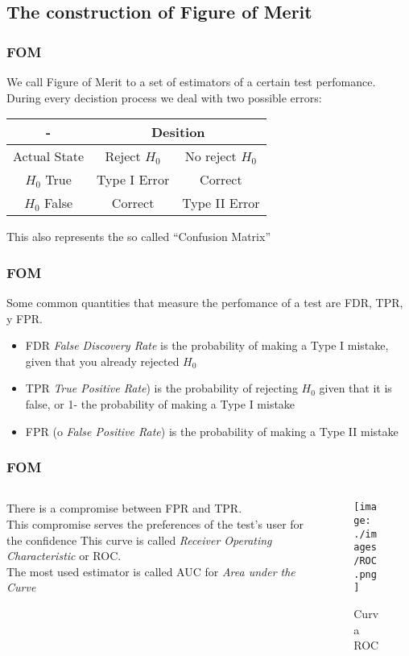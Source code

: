 \documentclass[10pt]{beamer}
\begin{document}
\subsection{The construction of Figure of Merit}
\begin{frame}\frametitle{FOM}
 We call Figure of Merit to a set of estimators of a certain test perfomance.
During every decistion process we deal with two possible errors: 
\begin{center}
\begin{tabular}{|c|c|l|}
\hline
- & \multicolumn{2}{c|}{Desition}\\
\hline \hline
Actual State & Reject $H_0$ & \multicolumn{1}{c|}{No reject $H_0$}\\
\hline
$H_0$ True & Type I Error & \multicolumn{1}{c|}{Correct}\\
\hline
$H_0$ False & Correct & \multicolumn{1}{c|}{Type II Error}\\
\hline
\end{tabular}
\end{center}
This also represents the so called ``Confusion Matrix''
\end{frame}
\begin{frame} \frametitle{FOM}
 Some common quantities that measure the perfomance of a test are FDR, TPR, y FPR.
\begin{itemize}
 \item FDR \textit{False Discovery Rate} is the probability of making a Type I 
 mistake, given that you already rejected $H_0$
 \item TPR \textit{True Positive Rate}) is the probability of rejecting 
$H_0$ given that it is false, or 1- the probability of making a Type I mistake
\item FPR (o \textit{False Positive Rate}) is the probability 
 of making a Type II mistake
\end{itemize}
\end{frame}
\begin{frame} \frametitle{FOM}
 \begin{columns}[T]
\begin{column}{0.48\textwidth}\bigskip
There is a compromise between FPR and TPR.\\
This compromise serves the preferences of the test's user for the 
confidence
 This curve is called \textit{Receiver Operating Characteristic} or ROC.\\ 
  The most used estimator is called AUC for \textit{Area under the Curve}
 \end{column}
 \begin{column}{0.55\textwidth}
 \begin{figure}
 \centering
 \texttt{[image: ./images/ROC.png]}
 \caption{\scriptsize{Curva ROC}}
\end{figure}
\end{column}
 \end{columns}
\end{frame}
\end{document}
